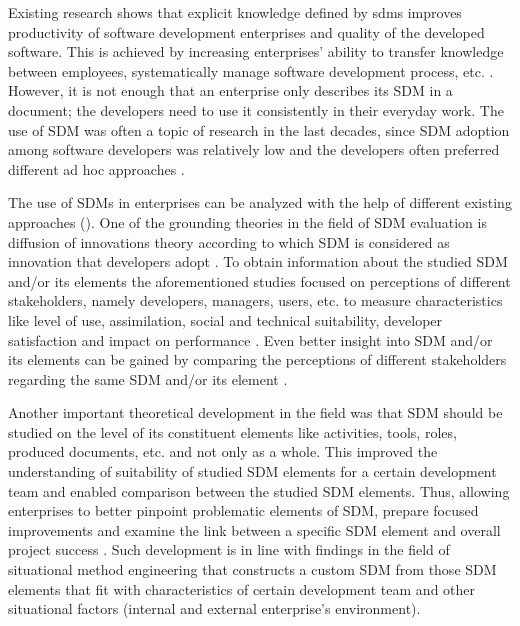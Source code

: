 Existing research shows that explicit knowledge defined by \glspl{sdm} improves productivity of software development enterprises and quality of the developed software. This is achieved by increasing enterprises’ ability to transfer knowledge between employees, systematically manage software development process, etc. \citep{avison2003information,DBLP:journals/iam/Fitzgerald98,hovelja2015exploring,DBLP:journals/tse/RiemenschneiderHD02}. However, it is not enough that an enterprise only describes its SDM in a document; the developers need to use it consistently in their everyday work. The use of SDM was often a topic of research in the last decades, since SDM adoption among software developers was relatively low and the developers often preferred different ad hoc approaches \citep{DBLP:journals/software/Aaen03,DBLP:journals/isj/Fitzgerald96,DBLP:journals/iam/HuismanI06}. 

The use of SDMs in enterprises can be analyzed with the help of different existing approaches (\citealp{DBLP:journals/imds/Aboelmaged10,venkatesh2000theoretical,DBLP:journals/behaviourIT/WangLH13}). One of the grounding theories in the field of SDM evaluation is diffusion of innovations theory \citep{DBLP:books/daglib/0012785} according to which SDM is considered as innovation that developers adopt \citep{DBLP:journals/iam/Gallivan03,DBLP:journals/infsof/GreenHC05,DBLP:conf/caise/IivariH01}. To obtain information about the studied SDM and/or its elements the aforementioned studies focused on perceptions of different stakeholders, namely developers, managers, users, etc. to measure characteristics like level of use, assimilation, social and technical suitability, developer satisfaction and impact on performance \citep{atkinson1999project,cooper1990information,DBLP:books/daglib/0012785,DBLP:journals/infsof/VavpoticB09,DBLP:journals/comsis/VavpoticH12}. Even better insight into SDM and/or its elements can be gained by comparing the perceptions of different stakeholders regarding the same SDM and/or its element \citep{hovelja2015exploring}. 

Another important theoretical development in the field was that SDM should be studied on the level of its constituent elements like activities, tools, roles, produced documents, etc. and not only as a whole. This improved the understanding of suitability of studied SDM elements for a certain development team and enabled comparison between the studied SDM elements. Thus, allowing enterprises to better pinpoint problematic elements of SDM, prepare focused improvements and examine the link between a specific SDM element and overall project success \citep{atkinson1999project,hovelja2015exploring}. Such development is in line with findings in the field of situational method engineering \citep{DBLP:journals/ejis/KarlssonA09,DBLP:conf/caise/RalyteDR03} that constructs a custom SDM from those SDM elements that fit with characteristics of certain development team and other situational factors (internal and external enterprise’s environment). 

